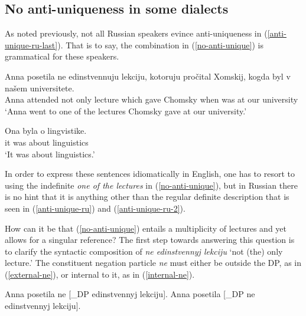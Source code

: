 \subsection{No anti-uniqueness in some dialects \label{sec:no-anti-unique}}
As noted previously, not all Russian speakers evince anti-uniqueness in (\ref{anti-unique-ru-last}). That is to say, the combination in (\ref{no-anti-unique}) is grammatical for these speakers.

\begin{exe}
	\ex \label{no-anti-unique} \begin{xlist}
		\ex \gll Anna posetila ne edinstvennuju lekciju, kotoruju pro\v{c}ital Xomskij, kogda byl v na\v{s}em universitete.\\
		Anna attended not only lecture which gave Chomsky when was at our university\\
		\glt `Anna went to one of the lectures Chomsky gave at our university.'
		
		\ex \gll Ona byla o lingvistike.\\
		it was about linguistics\\
		\glt `It was about linguistics.'
	\end{xlist}
\end{exe}

In order to express these sentences idiomatically in English, one has to resort to using the indefinite \textit{one of the lectures} in (\ref{no-anti-unique}), but in Russian there is no hint that it is anything other than the regular definite description that is seen in (\ref{anti-unique-ru}) and (\ref{anti-unique-ru-2}).


How can it be that (\ref{no-anti-unique}) entails a multiplicity of lectures and yet allows for a singular reference? The first step towards answering this question is to clarify the syntactic composition of \textit{ne edinstvennyj lekciju} `not (the) only lecture.' The constituent negation particle \textit{ne} must either be outside the DP, as in (\ref{external-ne}), or internal to it, as in (\ref{internal-ne}).

\begin{exe}
	\ex \label{external-ne} Anna posetila ne [_{DP} edinstvennyj lekciju].
	\ex \label{internal-ne} Anna posetila [_{DP} ne edinstvennyj lekciju].
\end{exe}


